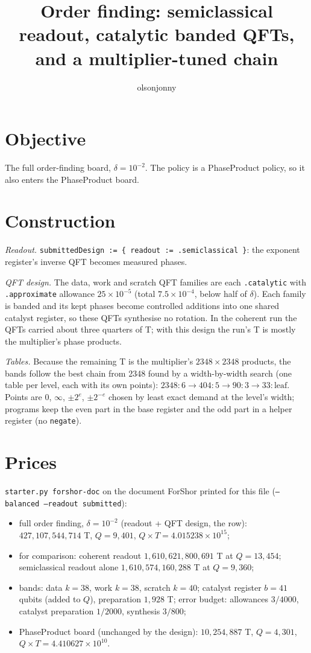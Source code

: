 \documentclass[11pt]{article}
\title{Order finding: semiclassical readout, catalytic banded QFTs, and a multiplier-tuned chain}
\author{olsonjonny}
\date{}
\begin{document}
\maketitle

\section*{Objective}
The full order-finding board, $\delta = 10^{-2}$. The policy is a PhaseProduct policy, so it also enters the PhaseProduct board.

\section*{Construction}
\emph{Readout.} \texttt{submittedDesign := \{ readout := .semiclassical \}}: the exponent register's inverse QFT becomes measured phases.

\emph{QFT design.} The data, work and scratch QFT families are each \texttt{.catalytic} with \texttt{.approximate} allowance $25\times10^{-5}$ (total $7.5\times10^{-4}$, below half of $\delta$). Each family is banded and its kept phases become controlled additions into one shared catalyst register, so these QFTs synthesise no rotation. In the coherent run the QFTs carried about three quarters of T; with this design the run's T is mostly the multiplier's phase products.

\emph{Tables.} Because the remaining T is the multiplier's $2348 \times 2348$ products, the bands follow the best chain from 2348 found by a width-by-width search (one table per level, each with its own points): $2348{:}6 \to 404{:}5 \to 90{:}3 \to 33{:}\mathrm{leaf}$. Points are $0$, $\infty$, $\pm 2^e$, $\pm 2^{-e}$ chosen by least exact demand at the level's width; programs keep the even part in the base register and the odd part in a helper register (no \texttt{negate}).

\section*{Prices}
\texttt{starter.py forshor-doc} on the document ForShor printed for this file (\texttt{--balanced --readout submitted}):
\begin{itemize}
  \item full order finding, $\delta = 10^{-2}$ (readout + QFT design, the row): $427{,}107{,}544{,}714$ T, $Q = 9{,}401$, $Q \times T = 4.015238 \times 10^{15}$;
  \item for comparison: coherent readout $1{,}610{,}621{,}800{,}691$ T at $Q = 13{,}454$; semiclassical readout alone $1{,}610{,}574{,}160{,}288$ T at $Q = 9{,}360$;
  \item bands: data $k = 38$, work $k = 38$, scratch $k = 40$; catalyst register $b = 41$ qubits (added to $Q$), preparation $1{,}928$ T; error budget: allowances $3/4000$, catalyst preparation $1/2000$, synthesis $3/800$;
  \item PhaseProduct board (unchanged by the design): $10{,}254{,}887$ T, $Q = 4{,}301$, $Q \times T = 4.410627 \times 10^{10}$.
\end{itemize}
\end{document}
